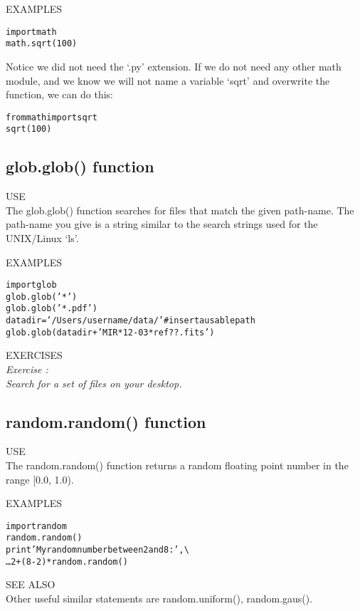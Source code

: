 {\color{blue} {\sf\small EXAMPLES}} 
\begin{alltt}
\pytab import math
\pytab math.sqrt(100)
\end{alltt}
Notice we did not need the `.py' extension. If we do not need any other
math module, and we know we will not name a variable `sqrt' and
overwrite the function, we can do this:
\begin{alltt}
\pytab from math import sqrt
\pytab sqrt(100)
\end{alltt}

\subsection{ {\sf glob.glob() } function}
{\color{blue} {\sf\small USE}} \\
The {\sf\small glob.glob()} function searches for files that match
the given path-name.  The path-name you give is a string similar to
the search strings used for the UNIX/Linux `ls'.

{\color{blue} {\sf\small EXAMPLES}} 
\begin{alltt}
\pytab import glob 
\pytab glob.glob('*') 
\pytab glob.glob('*.pdf')  
\pytab datadir = '/Users/username/data/'  #insert a usable path
\pytab glob.glob(datadir + 'MIR*12-03*ref??.fits')
\end{alltt}
{\color{blue} {\sf\small EXERCISES}} \\
{\it Exercise  :  \\
Search for a set of files on your desktop.}

\subsection{ {\sf random.random() } function}
{\color{blue} {\sf\small USE}} \\
The {\sf\small random.random()} function returns a random floating point
number in the range [0.0, 1.0). 
  
{\color{blue} {\sf\small EXAMPLES}} 
\begin{alltt}
\pytab import random 
\pytab random.random() 
\pytab print 'My random number between 2 and 8: ', \textbackslash
\ldots    2 + (8-2) * random.random()
\end{alltt}
{\color{blue} {\sf\small SEE ALSO}} \\
Other useful similar statements are {\sf\small random.uniform(), random.gaus()}.  \\

